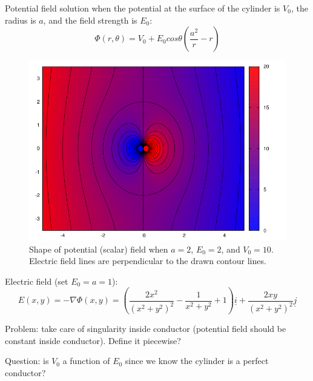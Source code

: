 \documentclass[a4paper,10pt]{article}
\begin{document}
\thispagestyle{empty}
Potential field solution when the potential at the surface of the cylinder is $V_0$, the radius is $a$, and the field strength is $E_0$:
\[ \Phi(r, \theta) = V_0 + E_0 cos\theta \left( \frac{a^2}{r} - r\right) \]
\begin{figure}[h!]
\includegraphics[width=\textwidth]{potential.png}
\caption{Shape of potential (scalar) field when $a = 2$, $E_0 = 2$, and $V_0 = 10$. Electric field lines are perpendicular to the drawn
contour lines.}
\end{figure}


Electric field (set $E_0 = a = 1$):
\[ E(x,y) = - \nabla\Phi(x,y) = \left(\frac{2 x^2}{(x^2+y^2)^2}-\frac{1}{x^2+y^2}+1\right)\underline{i} + \frac{2 x y}{(x^2+y^2)^2}\underline{j} \]

\vspace{1cm}

Problem: take care of singularity inside conductor (potential field should be constant inside conductor). Define it piecewise?

\vspace{1cm}

Question: is $V_0$ a function of $E_0$ since we know the cylinder is a perfect conductor?
\end{document}
